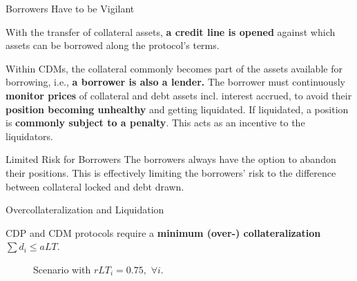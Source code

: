 \documentclass[handout]{beamer}
\begin{document}
\begin{frame}{Borrowers Have to be Vigilant}

With the transfer of collateral assets, \textbf{a credit line is opened }against which assets can be borrowed along the protocol’s terms.

 {
\vspace{0.8 em}
Within CDMs, the collateral commonly becomes part of the assets available for borrowing, i.e., \textbf{a borrower is also a lender.}
}
 {
\vspace{0.8 em}
The borrower must continuously \textbf{monitor prices} of collateral and debt assets incl. interest accrued, to avoid their \textbf{position becoming unhealthy} and getting liquidated.
}
 {
\vspace{0.8 em}
If liquidated, a position is \textbf{commonly subject to a penalty}. This acts as an incentive to the liquidators.
}

 {
\vspace{0.8 em}
\begin{keytakeaway}{Limited Risk for Borrowers}
	The borrowers always have the option to abandon their positions. This is effectively limiting the borrowers' risk to the difference between collateral locked and debt drawn.
\end{keytakeaway}
}
	
\end{frame}


\begin{frame}{Overcollateralization and Liquidation}

CDP and CDM protocols require a \textbf{minimum (over-) collateralization} $\sum d_i \leq aLT$.
\vspace{1em}

\begin{minipage}{0.6\textwidth}
	\vspace{1.5em}
	\begin{figure}[t]
		\centering
		\begin{tikzpicture}[scale=0.5, every node/.style={scale=0.8}]
			
		\end{tikzpicture}
		\caption{Scenario with $rLT_i = 0.75,$ $\forall i$.}
	\end{figure}
\end{minipage}
\begin{minipage}{0.38\textwidth}
	
	
	\vspace{1em}
\end{minipage}
	
\end{frame}
\end{document}

